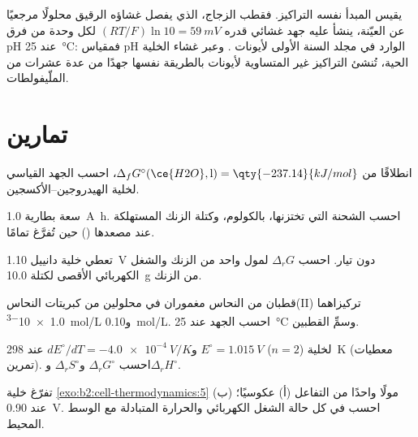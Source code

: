 يقيس المبدأ نفسه التراكيز. فقطب الزجاج، الذي يفصل غشاؤه الرقيق
محلولًا مرجعيًا عن العيّنة، ينشأ عليه جهد غشائي قدره
$(RT/F)\ln 10 = \qty{59}{mV}$ لكل وحدة من فرق pH عند
\qty{25}{\degreeCelsius}: فمقياس pH الوارد في مجلد السنة الأولى 
لأيونات . وعبر غشاء الخلية الحية، تُنشئ التراكيز غير المتساوية
لأيونات  بالطريقة نفسها جهدًا من عدة عشرات من الملّيفولطات.

\section{تمارين}

\begin{exercise}[$\star$]\label{exo:b2:cell-thermodynamics:1}
انطلاقًا من $\Delta_f G^\circ(\ce{H2O}, \text{l}) = \qty{-237.14}{kJ/mol}$، احسب
الجهد القياسي لخلية الهيدروجين--الأكسجين.
\end{exercise}

\begin{exercise}[$\star$]\label{exo:b2:cell-thermodynamics:2}
سعة بطارية \qty{1.0}{A.h}. احسب الشحنة التي تختزنها، بالكولوم،
وكتلة الزنك المستهلكة عند مصعدها () حين
تُفرَّغ تمامًا.
\end{exercise}

\begin{exercise}[$\star$]\label{exo:b2:cell-thermodynamics:3}
تعطي خلية دانييل \qty{1.10}{V} دون تيار. احسب $\Delta_r G$ لمول واحد
من الزنك والشغل الكهربائي الأقصى لكتلة \qty{10.0}{g} من الزنك.
\end{exercise}

\begin{exercise}[$\star$]\label{exo:b2:cell-thermodynamics:4}
قطبان من النحاس مغموران في محلولين من كبريتات النحاس(II) تركيزاهما \qty{1.0e-3}{mol/L}
و\qty{0.10}{mol/L}. احسب الجهد عند \qty{25}{\degreeCelsius} وسمِّ
القطبين.
\end{exercise}

\begin{exercise}[$\star\star$]\label{exo:b2:cell-thermodynamics:5}
لخلية ($n = 2$) $E^\circ = \qty{1.015}{V}$ و$dE^\circ/dT = \qty{-4.0e-4}{V/K}$
عند \qty{298}{K} (معطيات تمرين). احسب $\Delta_r G^\circ$ و$\Delta_r S^\circ$ 
و$\Delta_r H^\circ$.
\end{exercise}

\begin{exercise}[$\star\star$]\label{exo:b2:cell-thermodynamics:6}
تفرّغ خلية \cref{exo:b2:cell-thermodynamics:5} مولًا واحدًا من التفاعل
(أ) عكوسيًا؛ (ب) عند \qty{0.90}{V}. احسب في كل حالة الشغل الكهربائي 
والحرارة المتبادلة مع الوسط المحيط.
\end{exercise}

